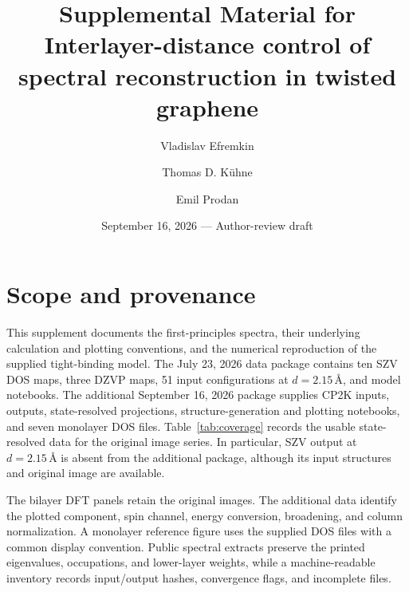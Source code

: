 \documentclass[aps,prl,10pt,onecolumn,superscriptaddress,longbibliography]{revtex4-2}
\newcommand{\angstrom}{\text{\AA}}
\begin{document}
\title{Supplemental Material for\\Interlayer-distance control of spectral reconstruction in twisted graphene}
\author{Vladislav Efremkin}
\author{Thomas D. K\"uhne}
\author{Emil Prodan}
\date{September 16, 2026 --- Author-review draft}
\maketitle

\section{Scope and provenance}

This supplement documents the first-principles spectra, their underlying calculation and plotting conventions, and the numerical reproduction of the supplied tight-binding model. The July 23, 2026 data package contains ten SZV DOS maps, three DZVP maps, 51 input configurations at $d=2.15\,\angstrom$, and model notebooks. The additional September 16, 2026 package supplies CP2K inputs, outputs, state-resolved projections, structure-generation and plotting notebooks, and seven monolayer DOS files. Table~\ref{tab:coverage} records the usable state-resolved data for the original image series. In particular, SZV output at $d=2.15\,\angstrom$ is absent from the additional package, although its input structures and original image are available.

The bilayer DFT panels retain the original images. The additional data identify the plotted component, spin channel, energy conversion, broadening, and column normalization. A monolayer reference figure uses the supplied DOS files with a common display convention. Public spectral extracts preserve the printed eigenvalues, occupations, and lower-layer weights, while a machine-readable inventory records input/output hashes, convergence flags, and incomplete files.
\end{document}
